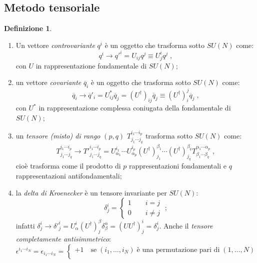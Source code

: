 \documentclass[12pt,a4paper]{article}
\theoremstyle{definition}
\newtheorem{dfn}{Definizione}[section]
\newcommand{\adj}[1]{#1^{\dagger}}
\numberwithin{equation}{section}
\begin{document}
\subsection{Metodo tensoriale}
\begin{dfn} 
\begin{enumerate}
\item Un vettore \emph{controvariante} $q^i$ è un oggetto che trasforma sotto $SU(N)$ come:
\begin{equation}
q^i\longrightarrow q'^i=U_{ij}q^j\equiv U^i_jq^j\;,
\end{equation}
con $U$ in rappresentazione fondamentale di $SU(N)$;
\item un vettore \emph{covariante} $\overline{q}_i$ è un oggetto che trasforma sotto $SU(N)$ come:
\begin{equation}
\overline{q}_i\longrightarrow \overline{q}'_i=U^*_{ij}\overline{q}_j=(\adj{U})_{ij}\overline{q}_j\equiv (\adj{U})^j_i\overline{q}_j\;,
\end{equation}
con $U^*$ in rappresentazione complessa coniugata della fondamentale di $SU(N)$;
\item un \emph{tensore (misto) di rango} $(p,q)$ $T^{i_1\cdots i_p}_{j_1\cdots j_q}$ trasforma sotto $SU(N)$ come:
\begin{equation}
T^{i_1\cdots i_p}_{j_1\cdots j_q}\longrightarrow T'^{i_1\cdots i_p}_{j_1\cdots j_q}=U^{i_1}_{\alpha_1}\cdots U^{i_p}_{\alpha_p}(\adj{U})^{\beta_1}_{j_1}\cdots (\adj{U})^{\beta_q}_{j_q}T^{\alpha_1\cdots \alpha_p}_{\beta_1\cdots\beta_q}\;,
\end{equation}
cioè trasforma come il prodotto di $p$ rappresentazioni fondamentali e $q$ rappresentazioni antifondamentali;
\item la \emph{delta di Kroenecker} è un tensore invariante per $SU(N)$:
\begin{equation}
\delta^i_j=\begin{cases}
1\qquad i=j \\
0\qquad i\ne j
\end{cases}\;;
\end{equation}
infatti $\delta^i_j\longrightarrow\delta'^i_j=U^i_{\alpha}(\adj{U})^{\beta}_j\delta^{\alpha}_{\beta}=(U\adj{U})^i_j=\delta^i_j$. Anche il \emph{tensore completamente antisimmetrico}:
\begin{equation}
\epsilon^{i_1\cdots i_N}=\epsilon_{i_1\cdots i_N}=\begin{cases}
+1\quad \mbox{se}\; (i_1,\ldots,i_N)\;\mbox{è una permutazione pari di}\; (1,\ldots,N) \\

\end{cases}
\end{equation}
\end{enumerate}
\end{dfn}
\end{document}
